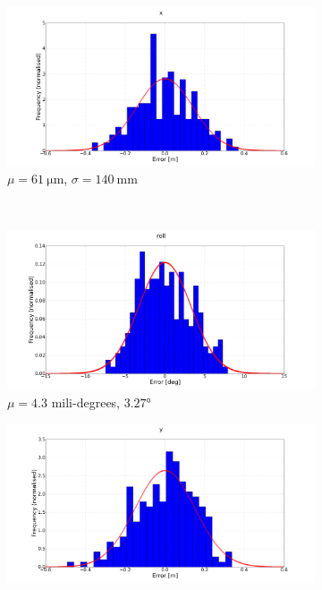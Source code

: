 \begin{figure}
  \centering
  \begin{subfigure}{0.48\textwidth}
    \includegraphics[width=\textwidth, clip, trim = 100 20 100 20]{figures/chapter5/err_x}
    \caption{$\mu = \SI{61}{\micro \m}$, $\sigma = \SI{140}{\mm}$}
  \end{subfigure}
  ~
  \begin{subfigure}{0.48\textwidth}
    \includegraphics[width=\textwidth, clip, trim = 100 20 100 20]{figures/chapter5/err_roll}
    \caption{$\mu = 4.3$ mili-degrees, $\ang{3.27}$}
  \end{subfigure}
  \begin{subfigure}{0.48\textwidth}
    \includegraphics[width=\textwidth, clip, trim = 100 20 100 20]{figures/chapter5/err_y}

\end{subfigure}
\end{figure}
